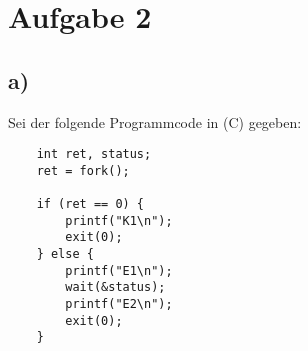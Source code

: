 \chapter{Aufgabe 2}

\section{a)}

Sei der folgende Programmcode in (C) gegeben:

\begin{verbatim}
    int ret, status;
    ret = fork();

    if (ret == 0) {
        printf("K1\n");
        exit(0);
    } else {
        printf("E1\n");
        wait(&status);
        printf("E2\n");
        exit(0);
    }
\end{verbatim}\\



